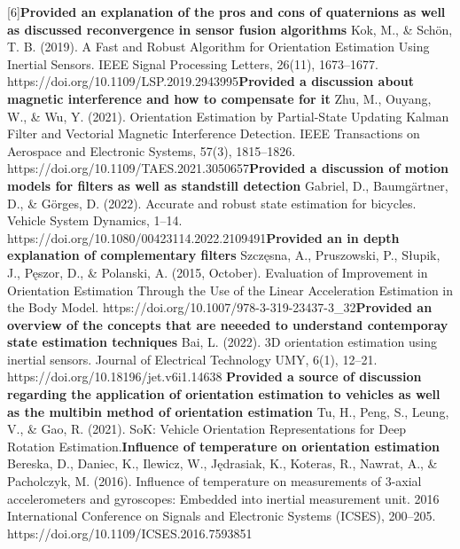 \documentclass[10pt]{report}
\begin{document}
[6]\textbf{Provided an explanation of the pros and cons of quaternions as well as discussed reconvergence in sensor fusion algorithms} \newline
 Kok, M., \& Schön, T. B. (2019). A Fast and Robust Algorithm for Orientation Estimation Using Inertial Sensors. IEEE Signal Processing Letters, 26(11), 1673–1677. https://doi.org/10.1109/LSP.2019.2943995\newline
[7]\textbf{Provided a discussion about magnetic interference and how to compensate for it} \newline
 Zhu, M., Ouyang, W., \& Wu, Y. (2021). Orientation Estimation by Partial-State Updating Kalman Filter and Vectorial Magnetic Interference Detection. IEEE Transactions on Aerospace and Electronic Systems, 57(3), 1815–1826. https://doi.org/10.1109/TAES.2021.3050657\newline
[8] \textbf{Provided a discussion of motion models for filters as well as standstill detection} \newline
Gabriel, D., Baumgärtner, D., \& Görges, D. (2022). Accurate and robust state estimation for bicycles. Vehicle System Dynamics, 1–14. https://doi.org/10.1080/00423114.2022.2109491\newline
[9] \textbf{Provided an in depth explanation of complementary filters} \newline
Szczęsna, A., Pruszowski, P., Słupik, J., Pęszor, D., \& Polanski, A. (2015, October). Evaluation of Improvement in Orientation Estimation Through the Use of the Linear Acceleration Estimation in the Body Model. https://doi.org/10.1007/978-3-319-23437-3\_32\newline
[10] \textbf{Provided an overview of the concepts that are neeeded to understand contemporay state estimation techniques} \newline
Bai, L. (2022). 3D orientation estimation using inertial sensors. Journal of Electrical Technology UMY, 6(1), 12–21. https://doi.org/10.18196/jet.v6i1.14638 \newline
[11] \textbf{Provided a source of discussion regarding the application of orientation estimation to vehicles as well as the multibin method of orientation estimation} \newline
Tu, H., Peng, S., Leung, V., \& Gao, R. (2021). SoK: Vehicle Orientation Representations for Deep Rotation Estimation.\newline
[12] \textbf{Influence of temperature on orientation estimation} \newline
Bereska, D., Daniec, K., Ilewicz, W., Jędrasiak, K., Koteras, R., Nawrat, A., \& Pacholczyk, M. (2016). Influence of temperature on measurements of 3-axial accelerometers and gyroscopes: Embedded into inertial measurement unit. 2016 International Conference on Signals and Electronic Systems (ICSES), 200–205. https://doi.org/10.1109/ICSES.2016.7593851\newline
\end{document}
